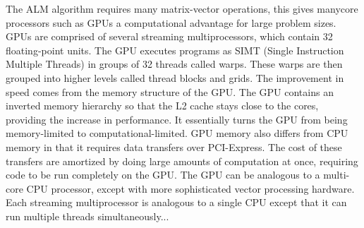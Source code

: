 \documentclass[10pt,twocolumn,letterpaper]{article}
\begin{document}
The ALM algorithm requires many matrix-vector operations, this gives manycore processors such as GPUs a computational advantage for large problem sizes.  
GPUs are comprised of several streaming multiprocessors, which contain 32 floating-point units.  The GPU executes programs as SIMT (Single Instruction Multiple Threads) in groups of 32 threads called warps.  These warps are then grouped into higher levels called thread blocks and grids.  The improvement in speed comes from the memory structure of the GPU.   The GPU contains an inverted memory hierarchy so that the L2 cache stays close to the cores, providing the increase in performance.  It essentially turns the GPU from being memory-limited to computational-limited.
GPU memory also differs from CPU memory in that it requires data transfers over PCI-Express.  The cost of these transfers are amortized by doing large amounts of computation at once, requiring code to be run completely on the GPU.  The GPU can be analogous to a multi-core CPU processor, except with more sophisticated vector processing hardware.  Each streaming multiprocessor is analogous to a single CPU except that it can run multiple threads simultaneously... 




\end{document}
